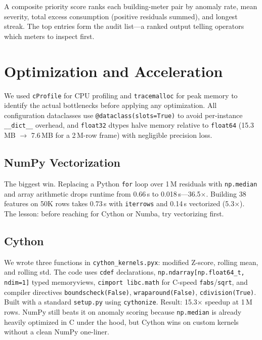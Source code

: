 \documentclass[conference]{IEEEtran}
\begin{document}
A composite priority score ranks each building-meter pair by anomaly rate, mean severity, total excess consumption (positive residuals summed), and longest streak. The top entries form the audit list---a ranked output telling operators which meters to inspect first.

\section{Optimization and Acceleration}

We used \texttt{cProfile} for CPU profiling and \texttt{tracemalloc} for peak memory to identify the actual bottlenecks before applying any optimization. All configuration dataclasses use \texttt{@dataclass(slots=True)} to avoid per-instance \texttt{\_\_dict\_\_} overhead, and \texttt{float32} dtypes halve memory relative to \texttt{float64} (15.3\,MB $\to$ 7.6\,MB for a 2\,M-row frame) with negligible precision loss.

\subsection{NumPy Vectorization}

The biggest win. Replacing a Python \texttt{for} loop over 1\,M residuals with \texttt{np.median} and array arithmetic drops runtime from 0.66\,s to 0.018\,s---36.5$\times$. Building 38 features on 50K rows takes 0.73\,s with \texttt{iterrows} and 0.14\,s vectorized (5.3$\times$). The lesson: before reaching for Cython or Numba, try vectorizing first.

\subsection{Cython}

We wrote three functions in \texttt{cython\_kernels.pyx}: modified Z-score, rolling mean, and rolling std. The code uses \texttt{cdef} declarations, \texttt{np.ndarray[np.float64\_t, ndim=1]} typed memoryviews, \texttt{cimport libc.math} for C-speed \texttt{fabs}/\texttt{sqrt}, and compiler directives \texttt{boundscheck(False)}, \texttt{wraparound(False)}, \texttt{cdivision(True)}. Built with a standard \texttt{setup.py} using \texttt{cythonize}. Result: 15.3$\times$ speedup at 1\,M rows. NumPy still beats it on anomaly scoring because \texttt{np.median} is already heavily optimized in C under the hood, but Cython wins on custom kernels without a clean NumPy one-liner.
\end{document}
